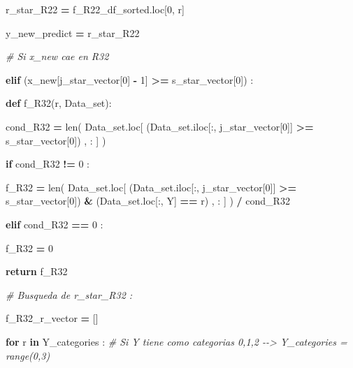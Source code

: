 \documentclass[
  11pt,
  a4paper,
]{article}
\newenvironment{Shaded}{\begin{snugshade}}{\end{snugshade}}
\newcommand{\BuiltInTok}[1]{#1}
\newcommand{\CommentTok}[1]{\textcolor[rgb]{0.56,0.35,0.01}{\textit{#1}}}
\newcommand{\ControlFlowTok}[1]{\textcolor[rgb]{0.13,0.29,0.53}{\textbf{#1}}}
\newcommand{\DecValTok}[1]{\textcolor[rgb]{0.00,0.00,0.81}{#1}}
\newcommand{\KeywordTok}[1]{\textcolor[rgb]{0.13,0.29,0.53}{\textbf{#1}}}
\newcommand{\NormalTok}[1]{#1}
\newcommand{\OperatorTok}[1]{\textcolor[rgb]{0.81,0.36,0.00}{\textbf{#1}}}
\newcommand{\StringTok}[1]{\textcolor[rgb]{0.31,0.60,0.02}{#1}}
\begin{document}
\begin{Shaded}
\begin{Highlighting}[]
\NormalTok{                r\_star\_R22 }\OperatorTok{=}\NormalTok{ f\_R22\_df\_sorted.loc[}\DecValTok{0}\NormalTok{, }\StringTok{\textquotesingle{}r\textquotesingle{}}\NormalTok{]}


\NormalTok{                y\_new\_predict }\OperatorTok{=}\NormalTok{ r\_star\_R22}


 

            \CommentTok{\# Si x\_new cae en R32}

            \ControlFlowTok{elif}\NormalTok{ (x\_new[j\_star\_vector[}\DecValTok{0}\NormalTok{] }\OperatorTok{{-}} \DecValTok{1}\NormalTok{] }\OperatorTok{\textgreater{}=}\NormalTok{ s\_star\_vector[}\DecValTok{0}\NormalTok{]) :}

                \KeywordTok{def}\NormalTok{ f\_R32(r, Data\_set):}

\NormalTok{                        cond\_R32 }\OperatorTok{=} \BuiltInTok{len}\NormalTok{( Data\_set.loc[ (Data\_set.iloc[:, j\_star\_vector[}\DecValTok{0}\NormalTok{]] }\OperatorTok{\textgreater{}=}\NormalTok{ s\_star\_vector[}\DecValTok{0}\NormalTok{]) , : ] ) }

                        \ControlFlowTok{if}\NormalTok{  cond\_R32 }\OperatorTok{!=} \DecValTok{0}\NormalTok{ :}

\NormalTok{                            f\_R32 }\OperatorTok{=} \BuiltInTok{len}\NormalTok{( Data\_set.loc[ (Data\_set.iloc[:, j\_star\_vector[}\DecValTok{0}\NormalTok{]] }\OperatorTok{\textgreater{}=}\NormalTok{ s\_star\_vector[}\DecValTok{0}\NormalTok{]) }\OperatorTok{\&}\NormalTok{ (Data\_set.loc[:, }\StringTok{\textquotesingle{}Y\textquotesingle{}}\NormalTok{] }\OperatorTok{==}\NormalTok{ r) , : ] ) }\OperatorTok{/}\NormalTok{ cond\_R32}

            
                        \ControlFlowTok{elif}\NormalTok{ cond\_R32 }\OperatorTok{==} \DecValTok{0}\NormalTok{ :}

\NormalTok{                            f\_R32 }\OperatorTok{=} \DecValTok{0}
           
                        \ControlFlowTok{return}\NormalTok{ f\_R32 }

                
            \CommentTok{\# Busqueda de r\_star\_R32 :}

\NormalTok{                f\_R32\_r\_vector }\OperatorTok{=}\NormalTok{ []}

                \ControlFlowTok{for}\NormalTok{ r }\KeywordTok{in}\NormalTok{ Y\_categories :  }\CommentTok{\# Si Y tiene como categorias 0,1,2 {-}{-}\textgreater{} Y\_categories = range(0,3)}


\end{Highlighting}
\end{Shaded}
\end{document}
